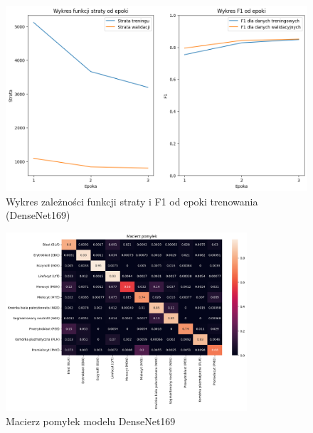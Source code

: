 \begin{figure}
    \centering
    \includegraphics[width=\textwidth]{experiments/densenet169/combined}
    \caption{Wykres zależności funkcji straty i F1 od epoki trenowania (DenseNet169)}
    \label{fig:plot_densenet169}
\end{figure}
\begin{figure}
    \centering
    \includegraphics[width=0.8\textwidth]{experiments/densenet169/confusion_matrix}
    \caption{Macierz pomyłek modelu DenseNet169}
    \label{fig:confusion_densenet169}
\end{figure}

